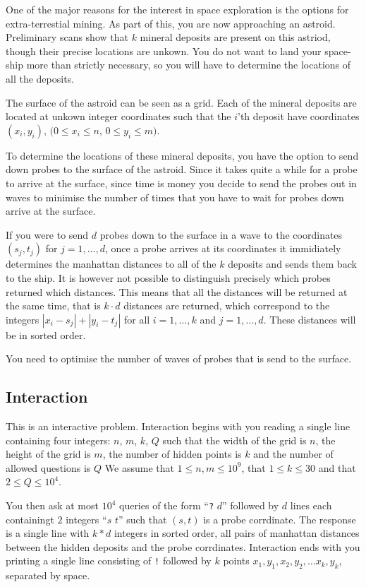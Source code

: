 One of the major reasons for the interest in space exploration is the options for extra-terrestial mining. 
As part of this, you are now approaching an astroid. Preliminary scans show that $k$ mineral deposits are present on this astriod, though their precise locations are unkown.
You do not want to land your space-ship more than strictly necessary, so you will have to determine the locations of all the deposits.

\medskip

The surface of the astroid can be seen as a grid.
Each of the mineral deposits are located at unkown integer coordinates such that the $i$'th deposit have coordinates $(x_i,y_i)$, $(0 \le x_i \le n$, $0\le y_i \le m)$.

To determine the locations of these mineral deposits, you have the option to send down probes to the surface of the astroid. 
Since it takes quite a while for a probe to arrive at the surface, since time is money you decide to send the probes out in waves to minimise the number of times that you have to wait for probes down arrive at the surface.

If you were to send $d$ probes down to the surface in a wave to the coordinates $(s_j,t_j)$ for $j=1,\ldots,d$, once a probe arrives at its coordinates it immidiately determines the manhattan distances to all of the $k$ deposits and sends them back to the ship. 
It is however not possible to distinguish precisely which probes returned which distances. 
This means that all the distances will be returned at the same time, that is $k\cdot d$ distances are returned, which correspond to the integers $|x_i-s_j| + |y_i - t_j|$ for all $i = 1,\ldots,k$ and $j = 1,\ldots,d$.
These distances will be in sorted order.

You need to optimise the number of waves of probes that is send to the surface.
\subsection*{Interaction}

This is an interactive problem.
Interaction begins with you reading a single line containing four integers: $n$, $m$, $k$, $Q$ such that the width of the grid is $n$, 
the height of the grid is $m$, the number of hidden points is $k$ and the number of allowed questions is $Q$
We assume that $1\leq n,m\leq 10^9$, that $1 \leq k \leq 30$ and that $2 \le Q \le 10^4$.

You then ask at most $10^4$ queries of the form ``\texttt{?} $d$'' followed by $d$ lines each containingt $2$ integers ``$s$ $t$'' such that $(s,t)$ is a probe corrdinate.
The response is a single line with $k *d$ integers in sorted order, all pairs of manhattan distances between the hidden deposits and the probe corrdinates.
Interaction ends with you printing a single line consisting of \texttt{!} followed by $k$ points $x_1, y_1, x_2, y_2, \ldots x_k, y_k$, separated by space.

